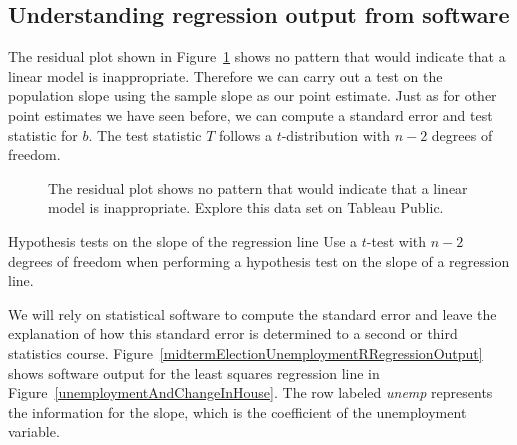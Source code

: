 \D{\newpage}

\subsection{Understanding regression output from software}
\label{testStatisticForTheSlope}

The residual plot shown in Figure~\ref{unemploymentAndChangeInHouseResiduals} shows no pattern that would indicate that a linear model is inappropriate.  Therefore we can carry out a test on the population slope using the sample slope as our point estimate.  Just as for other point estimates we have seen before, we can compute a standard error and test statistic for $b$. The test statistic $T$ follows a $t$-distribution with $n-2$ degrees of freedom.

\begin{figure}[h]
\centering
{}
\caption{The residual plot shows no pattern that would indicate that a linear model is inappropriate.  Explore this data set on Tableau Public.}
\label{unemploymentAndChangeInHouseResiduals}
\end{figure}

\begin{onebox}{Hypothesis tests on the slope of the regression line}
Use a $t$-test with $n - 2$ degrees of freedom when performing a hypothesis test on the slope of a regression line.\end{onebox}


We will rely on statistical software to compute the standard error and leave the explanation of how this standard error is determined to a second or third statistics course.
Figure~\ref{midtermElectionUnemploymentRRegressionOutput} shows software output for the least squares regression line in Figure~\ref{unemploymentAndChangeInHouse}. The row labeled \emph{unemp} represents the information for the slope, which is the coefficient of the unemployment variable.


